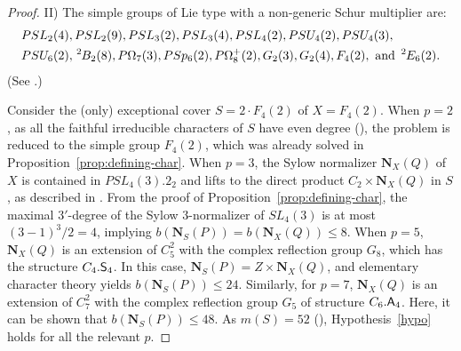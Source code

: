 \documentclass[12pt]{amsart}
\theoremstyle{plain}
\theoremstyle{definition}
\numberwithin{equation}{section}
\newcommand{\bN}{\mathbf{N}}
\newcommand{\ta}{\hspace{0.5mm}^{2}\hspace*{-0.2mm}}
\newcommand{\Al}{\textup{\textsf{A}}}
\newcommand{\Sy}{\textup{\textsf{S}}}
\begin{document}
\begin{proof}
\medskip

II) The simple groups of Lie type with a non-generic Schur
multiplier are: \begin{align*}&PSL_2(4), PSL_2(9), PSL_3(2),
PSL_3(4), PSL_4(2), PSU_4(2), PSU_4(3),\\ &PSU_6(2),\ta B_2(8),
P\Omega_7(3), PSp_6(2), P\Omega^+_8(2), G_2(3), G_2(4), F_4(2),
\text{ and } \ta E_6(2).\end{align*} (See \cite[Table~24.3]{MT11}.)

Consider the (only) exceptional cover $S=2\cdot F_4(2)$ of
$X=F_4(2)$. When $p=2$, as all the faithful irreducible characters
of $S$ have even degree (\cite{Atlas}), the problem is reduced to
the simple group $F_4(2)$, which was already solved in
Proposition~\ref{prop:defining-char}. When $p=3$, the Sylow
normalizer $\bN_X(Q)$ of $X$ is contained in $PSL_4(3).2_2$ and
lifts to the direct product $C_2\times \bN_X(Q)$ in $S$, as
described in \cite[\S4]{Malle08}. From the proof of
Proposition~\ref{prop:defining-char}, the maximal $3'$-degree of the
Sylow $3$-normalizer of $SL_4(3)$ is at most $(3-1)^3/2=4$, implying
$b(\bN_S(P))=b(\bN_X(Q))\leq 8$. When $p=5$, $\bN_X(Q)$ is an
extension of $C_5^2$ with the complex reflection group $G_8$, which
has the structure $C_4.\Sy_4$. In this case,
$\bN_S(P)=Z\times\bN_X(Q)$, and elementary character theory yields
$b(\bN_S(P))\leq 24$. Similarly, for $p=7$, $\bN_X(Q)$ is an
extension of $C_7^2$ with the complex reflection group $G_5$ of
structure $C_6.\Al_4$. Here, it can be shown that $b(\bN_S(P))\leq
48$. As $m(S)=52$ (\cite{Atlas}), Hypothesis~\ref{hypo} holds for
all the relevant $p$.


\end{proof}
\end{document}

